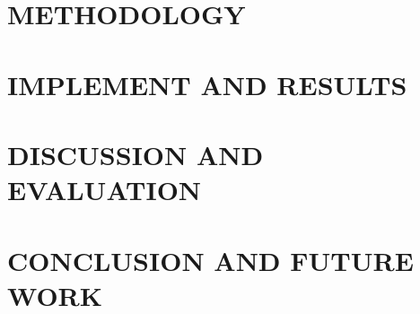 \documentclass[12pt, oneside]{report}
\begin{document}
\chapter{METHODOLOGY}


\chapter{IMPLEMENT AND RESULTS}


\chapter{DISCUSSION AND EVALUATION}

	
\chapter{CONCLUSION AND FUTURE WORK}




\end{document}
